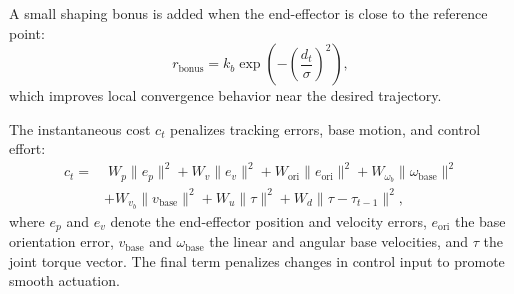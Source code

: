 \documentclass{ieeeaccess}
\begin{document}
A small shaping bonus is added when the end-effector is close to the reference
point:
\begin{equation}
r_{\text{bonus}} = k_b \exp\!\left(-\left(\frac{d_t}{\sigma}\right)^2\right),
\end{equation}
which improves local convergence behavior near the desired trajectory.

The instantaneous cost $c_t$ penalizes tracking errors, base motion, and control effort:
\begin{align}
c_t =&\;
W_p \|e_p\|^2
+ W_v \|e_v\|^2
+ W_{\text{ori}} \|e_{\text{ori}}\|^2
+ W_{\omega_b} \|\omega_{\text{base}}\|^2 \nonumber \\
&+ W_{v_b} \|v_{\text{base}}\|^2
+ W_u \|\tau\|^2
+ W_d \|\tau - \tau_{t-1}\|^2 ,
\end{align}
where $e_p$ and $e_v$ denote the end-effector position and velocity errors, $e_{\text{ori}}$ the base
orientation error, $v_{\text{base}}$ and $\omega_{\text{base}}$ the linear 
and angular base velocities, and $\tau$ the joint torque vector. The final term penalizes
changes in control input to promote smooth actuation.
\end{document}
